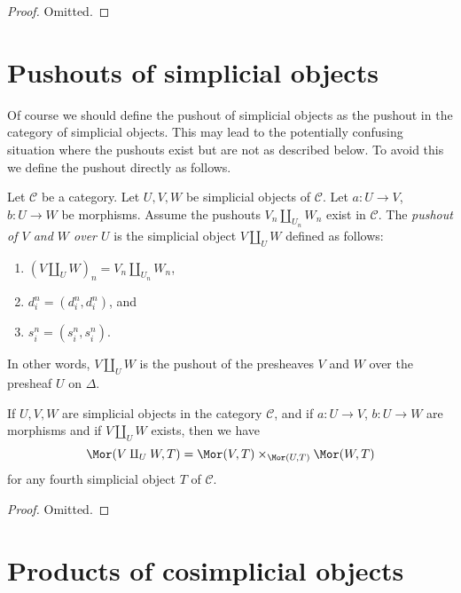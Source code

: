 \begin{proof}
Omitted.
\end{proof}

\section{Pushouts of simplicial objects}
\label{section-push-outs}

\noindent
Of course we should define the pushout of simplicial objects
as the pushout in the category of simplicial objects. This
may lead to the potentially confusing situation where the
pushouts exist but are not as described below. To avoid
this we define the pushout directly as follows.

\begin{definition}
\label{definition-push-out}
Let $\mathcal{C}$ be a category.
Let $U, V, W$ be simplicial objects of $\mathcal{C}$.
Let $a : U \to V$, $b : U \to W$ be morphisms.
Assume the pushouts $V_n \amalg_{U_n} W_n$ exist in $\mathcal{C}$.
The {\it pushout of $V$ and $W$ over $U$} is the simplicial object
$V\amalg_U W$ defined as follows:
\begin{enumerate}
\item $(V \amalg_U W)_n = V_n \amalg_{U_n} W_n$,
\item $d^n_i = (d^n_i, d^n_i)$, and
\item $s^n_i = (s^n_i, s^n_i)$.
\end{enumerate}
In other words, $V\amalg_U W$ is the pushout of the presheaves
$V$ and $W$ over the presheaf $U$ on $\Delta$.
\end{definition}

\begin{lemma}
\label{lemma-push-out}
If $U, V, W$ are simplicial objects in the category $\mathcal{C}$,
and if $a : U \to V$, $b : U \to W$ are morphisms
and if $V\amalg_U W$ exists, then we have
$$
\Mor(V\amalg_U W, T) =
\Mor(V, T) \times_{\Mor(U, T)}
\Mor(W, T)
$$
for any fourth simplicial object $T$ of $\mathcal{C}$.
\end{lemma}

\begin{proof}
Omitted.
\end{proof}











\section{Products of cosimplicial objects}
\label{section-products-cosimplicial}

